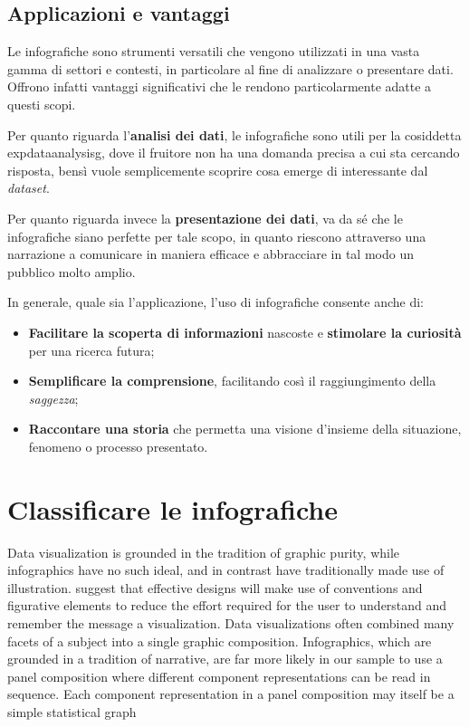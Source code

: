 \subsection{Applicazioni e vantaggi}
Le infografiche sono strumenti versatili che vengono utilizzati in una vasta gamma di settori e contesti, in particolare al fine 
di analizzare o presentare dati. Offrono infatti vantaggi significativi che le rendono particolarmente adatte a questi scopi.

Per quanto riguarda l'\textbf{analisi dei dati}, le infografiche sono utili per la cosiddetta \gls{expdataanalysisg}, dove il fruitore non ha una domanda precisa a cui sta cercando risposta, bensì 
vuole semplicemente scoprire cosa emerge di interessante dal \emph{dataset}.

Per quanto riguarda invece la \textbf{presentazione dei dati}, va da sé che le infografiche siano perfette per tale scopo, in quanto riescono attraverso una narrazione a comunicare in maniera efficace 
e abbracciare in tal modo un pubblico molto amplio.

\bigskip
\noindent In generale, quale sia l'applicazione, l'uso di infografiche consente anche di:
\begin{itemize}
    \item \textbf{Facilitare la scoperta di informazioni} nascoste e \textbf{stimolare la curiosità} per una ricerca futura;
    \item \textbf{Semplificare la comprensione}, facilitando così il raggiungimento della \emph{saggezza};
    \item \textbf{Raccontare una storia} che permetta una visione d'insieme della situazione, fenomeno o processo presentato.
\end{itemize}


\section{Classificare le infografiche}
Data visualization is grounded in the tradition of graphic purity, while infographics have no such ideal, and in contrast have traditionally made use of illustration.
 suggest that effective designs will make use of conventions and figurative elements to reduce the effort required for the user to understand and remember the message a visualization.
Data
visualizations often combined many facets of a subject into a single
graphic composition. Infographics, which are grounded in a tradition
of narrative, are far more likely in our sample to use a panel
composition where different component representations can be read
in sequence. Each component representation in a panel composition
may itself be a simple statistical graph

